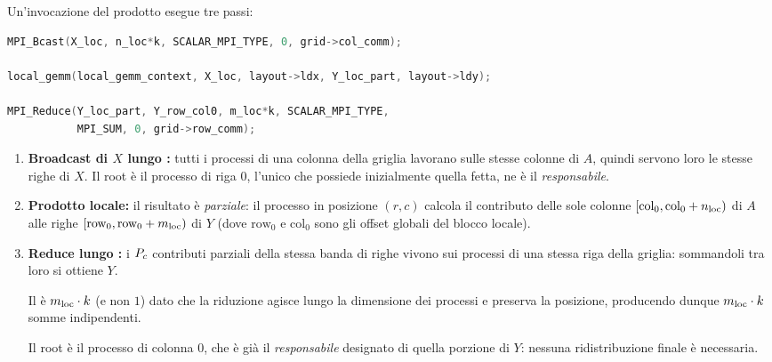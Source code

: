 Un'invocazione del prodotto esegue tre passi:

\begin{lstlisting}[language=C,caption={Il corpo di \code{mpi\_matmul}, senza i cronometri.}]
MPI_Bcast(X_loc, n_loc*k, SCALAR_MPI_TYPE, 0, grid->col_comm);

local_gemm(local_gemm_context, X_loc, layout->ldx, Y_loc_part, layout->ldy);

MPI_Reduce(Y_loc_part, Y_row_col0, m_loc*k, SCALAR_MPI_TYPE,
           MPI_SUM, 0, grid->row_comm);
\end{lstlisting}

\begin{enumerate}[nosep,left=0pt]
  \item \textbf{Broadcast di $X$ lungo :} tutti i processi di una
        colonna della griglia lavorano sulle stesse colonne di $A$, quindi
        servono loro le stesse righe di $X$. Il root è il processo di riga $0$,
        l'unico che possiede inizialmente quella fetta, ne è il \emph{responsabile}.
  \item \textbf{Prodotto locale:} il risultato \`e \emph{parziale}: il processo
        in posizione $(r,c)$ calcola il contributo delle sole colonne
        $[\text{col}_0, \text{col}_0 + n_{\text{loc}})$ di $A$ alle righe
        $[\text{row}_0, \text{row}_0 + m_{\text{loc}})$ di $Y$ (dove $\text{row}_0$ e $\text{col}_0$ sono gli offset globali del blocco locale).
  \item \textbf{Reduce lungo :} i $P_c$ contributi parziali
        della stessa banda di righe vivono sui processi di una stessa riga della
        griglia: sommandoli tra loro si ottiene $Y$.
        
        Il  \`e $m_{\text{loc}} \cdot k$
        (e non $1$) dato che la riduzione agisce lungo la dimensione dei processi e
        preserva la posizione, producendo dunque $m_{\text{loc}} \cdot k$ somme indipendenti.
        
        Il root è il processo di colonna $0$, che è già il \emph{responsabile} designato
        di quella porzione di $Y$: nessuna ridistribuzione finale è necessaria.
\end{enumerate}



